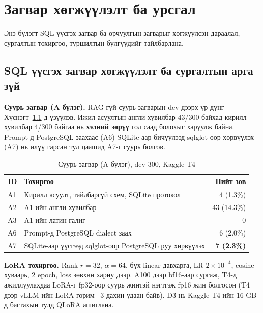 
\chapter{Загвар хөгжүүлэлт ба урсгал}
\label{ch:model}
\pagecolor{white}

Энэ бүлэгт SQL үүсгэх загвар ба орчуулгын загварыг хөгжүүлсэн дараалал, сургалтын тохиргоо, туршилтын бүлгүүдийг
тайлбарлана.

\section{SQL үүсгэх загвар хөгжүүлэлт ба сургалтын арга зүй}
\label{sec:baseline}

\textbf{Суурь загвар (A бүлэг).} RAG-гүй суурь загварын dev дээрх үр дүнг Хүснэгт~\ref{tab:a-group}-д үзүүлэв. Ижил асуултын
англи хувилбар 43/300 байхад кирилл хувилбар 4/300 байгаа нь \textbf{хэлний зөрүү} гол саад болохыг харуулж байна. Prompt-д
PostgreSQL заахаас (A6) SQLite-аар бичүүлээд sqlglot-оор хөрвүүлэх (A7) нь илүү гарсан тул цаашид A7-г суурь болгов.

\begin{table}[H]
\centering\small
\caption{Суурь загвар (A бүлэг), dev 300, Kaggle T4}
\label{tab:a-group}
\begin{tabularx}{\textwidth}{p{1.2cm}X r}
\toprule
ID & Тохиргоо & Нийт зөв \\
\midrule
A1 & Кирилл асуулт, тайлбаргүй схем, SQLite протокол & 4 (1.3\%) \\
A2 & A1-ийн англи хувилбар & 43 (14.3\%) \\
A3 & A1-ийн латин галиг & 0 \\
A6 & Prompt-д PostgreSQL dialect заах & 6 (2.0\%) \\
A7 & SQLite-аар үүсгээд sqlglot-оор PostgreSQL руу хөрвүүлэх & \textbf{7 (2.3\%)} \\
\bottomrule
\end{tabularx}
\end{table}

\textbf{LoRA тохиргоо.} Rank $r = 32$, $\alpha = 64$, бүх linear давхарга, LR $2\times10^{-4}$, cosine хуваарь, 2 epoch,
loss зөвхөн хариу дээр. A100 дээр bf16-аар сургаж, T4-д ажиллуулахдаа LoRA-г fp32-оор суурь жинтэй нэгтгэж fp16 жин
болгосон (T4 дээр vLLM-ийн LoRA горим ~3 дахин удаан байв). D3 нь Kaggle T4-ийн 16 GB-д багтахын тулд QLoRA ашиглана.

